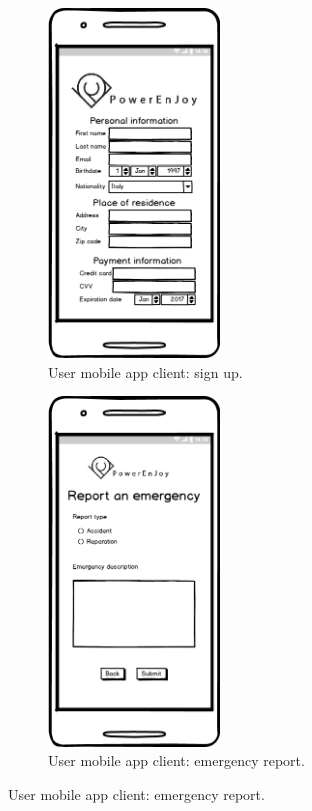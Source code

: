 	\begin{figure}[h]
		\begin{subfigure}{0.5\textwidth}
			\includegraphics[width=0.5\textwidth, center]{img/user_interface_design/App_sign_up.png}
			\caption{User mobile app client: sign up.}
		\end{subfigure}
		\begin{subfigure}{0.5\textwidth}
			\includegraphics[width=0.5\textwidth, center]{img/user_interface_design/User_emergency_report.png}
			\caption{User mobile app client: emergency report.}
		\end{subfigure}
	\end{figure}
\FloatBarrier

